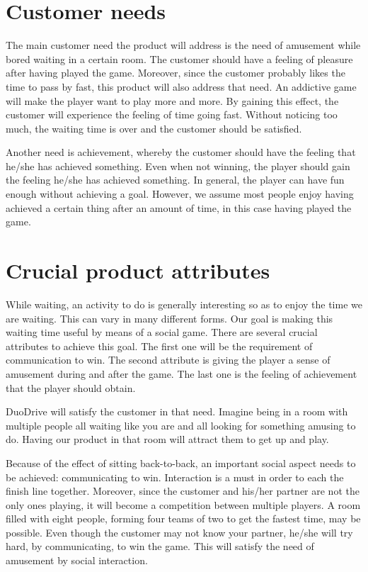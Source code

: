 \documentclass[11pt,twoside,a4paper]{article}
\begin{document}
\section{Customer needs}
The main customer need the product will address is the need of amusement while bored waiting in a certain room. The customer should have a feeling of pleasure after having played the game. Moreover, since the customer probably likes the time to pass by fast, this product will also address that need. An addictive game will make the player want to play more and more. By gaining this effect, the customer will experience the feeling of time going fast. Without noticing too much, the waiting time is over and the customer should be satisfied.

Another need is achievement, whereby the customer should have the feeling that he/she has achieved something. Even when not winning, the player should gain the feeling he/she has achieved something. In general, the player can have fun enough without achieving a goal. However, we assume most people enjoy having achieved a certain thing after an amount of time, in this case having played the game.


\section{Crucial product attributes}
While waiting, an activity to do is generally interesting so as to enjoy the time we are waiting. This can vary in many different forms. Our goal is making this waiting time useful by means of a social game. There are several crucial attributes to achieve this goal. The first one will be the requirement of communication to win. The second attribute is giving the player a sense of amusement during and after the game. The last one is the feeling of achievement that the player should obtain.

DuoDrive will satisfy the customer in that need. Imagine being in a room with multiple people all waiting like you are and all looking for something amusing to do. Having our product in that room will attract them to get up and play.

Because of the effect of sitting back-to-back, an important social aspect needs to be achieved: communicating to win. Interaction is a must in order to each the finish line together. Moreover, since the customer and his/her partner are not the only ones playing, it will become a competition between multiple players. A room filled with eight people, forming four teams of two to get the fastest time, may be possible. Even though the customer may not know your partner, he/she will try hard, by communicating, to win the game. This will satisfy the need of amusement by social interaction.
\end{document}
